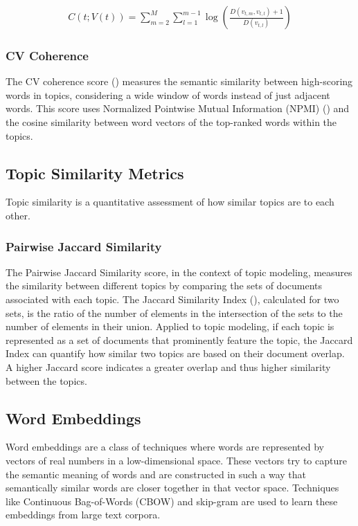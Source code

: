 \begin{align*}
C(t; V(t)) = \sum_{m=2}^{M} \sum_{l=1}^{m-1} \log \left( \frac{D(v_{t,m}, v_{t,l}) + 1}{D(v_{t,l})} \right)
\end{align*}
\subsubsection{CV Coherence}
\label{sec:CVCoherence}
The CV coherence score (\cite{Roder;Both;Hinneburg:15}) measures the semantic similarity between high-scoring words in topics, considering a wide window of words instead of just adjacent words. This score uses Normalized Pointwise Mutual Information (NPMI) (\cite{Aletras;Stevenson:13}) and the cosine similarity between word vectors of the top-ranked words within the topics.

\subsection{Topic Similarity Metrics} 
\label{sec:topicSimilarity}
Topic similarity is a quantitative assessment of how similar topics are to each other.

\subsubsection{Pairwise Jaccard Similarity}
The Pairwise Jaccard Similarity score, in the context of topic modeling, measures the similarity between different topics by comparing the sets of documents associated with each topic. The Jaccard Similarity Index (\cite{Jaccard:40}), calculated for two sets, is the ratio of the number of elements in the intersection of the sets to the number of elements in their union. Applied to topic modeling, if each topic is represented as a set of documents that prominently feature the topic, the Jaccard Index can quantify how similar two topics are based on their document overlap. A higher Jaccard score indicates a greater overlap and thus higher similarity between the topics.

\subsection{Word Embeddings}
Word embeddings \citep{mikolov2013efficient} are a class of techniques where words are represented by vectors of real numbers in a low-dimensional space. These vectors try to capture the semantic meaning of words and are constructed in such a way that semantically similar words are closer together in that vector space. Techniques like Continuous Bag-of-Words (CBOW) and skip-gram are used to learn these embeddings from large text corpora.

